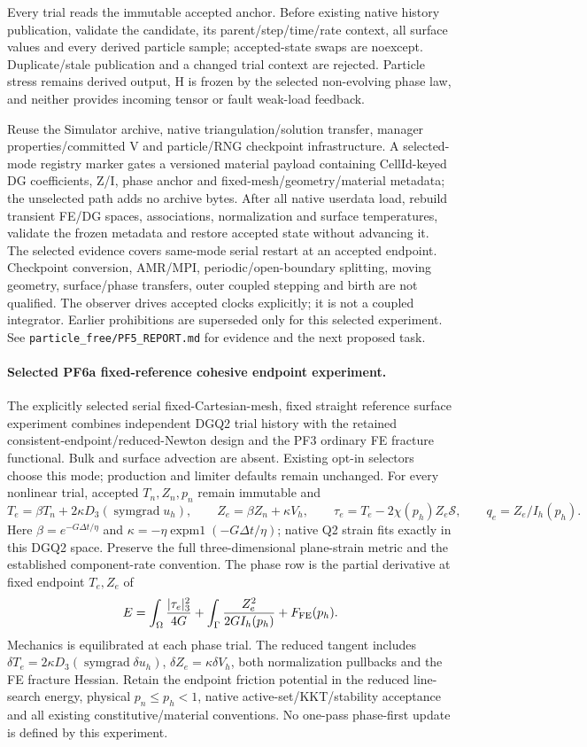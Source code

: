 \documentclass[11pt]{article}
\begin{document}
Every trial reads the immutable accepted anchor. Before existing native history
publication, validate the candidate, its parent/step/time/rate context, all
surface values and every derived particle sample; accepted-state swaps are
noexcept. Duplicate/stale publication and a changed trial context are rejected.
Particle stress remains derived output, H is frozen by the selected non-evolving
phase law, and neither provides incoming tensor or fault weak-load feedback.

Reuse the Simulator archive, native triangulation/solution transfer, manager
properties/committed V and particle/RNG checkpoint infrastructure. A selected-mode
registry marker gates a versioned material payload containing CellId-keyed DG
coefficients, Z/I, phase anchor and fixed-mesh/geometry/material metadata; the
unselected path adds no archive bytes. After all native userdata load, rebuild
transient FE/DG spaces, associations, normalization and surface temperatures,
validate the frozen metadata and restore accepted state without advancing it.
The selected evidence covers same-mode serial restart at an accepted endpoint.
Checkpoint conversion, AMR/MPI, periodic/open-boundary splitting, moving geometry,
surface/phase transfers, outer coupled stepping and birth are not qualified.
The observer drives accepted clocks explicitly; it is not a coupled integrator.
Earlier prohibitions are superseded only for this selected experiment.
See \texttt{particle\_free/PF5\_REPORT.md} for evidence and the next proposed task.

\paragraph{Selected PF6a fixed-reference cohesive endpoint experiment.}
The explicitly selected serial fixed-Cartesian-mesh, fixed straight reference
surface experiment combines independent DGQ2 trial history with the retained
consistent-endpoint/reduced-Newton design and the PF3 ordinary FE fracture
functional. Bulk and surface advection are absent. Existing opt-in selectors
choose this mode; production and limiter defaults remain unchanged.
For every nonlinear trial, accepted $T_n,Z_n,p_n$ remain immutable and
\[
 T_e=\beta T_n+2\kappa D_3(\operatorname{symgrad}u_h),\qquad
 Z_e=\beta Z_n+\kappa V_h,\qquad
 \tau_e=T_e-2\chi(p_h)Z_e\mathcal S,\qquad q_e=Z_e/I_h(p_h).
\]
Here $\beta=e^{-G\Delta t/\eta}$ and
$\kappa=-\eta\operatorname{expm1}(-G\Delta t/\eta)$; native Q2 strain fits
exactly in this DGQ2 space. Preserve the full three-dimensional plane-strain
metric and the established component-rate convention. The phase row is the
partial derivative at fixed endpoint $T_e,Z_e$ of
\[
 E=\int_\Omega\frac{|\tau_e|_3^2}{4G}
   +\int_\Gamma\frac{Z_e^2}{2G I_h(p_h)}+F_{\rm FE}(p_h).
\]
Mechanics is equilibrated at each phase trial. The reduced tangent includes
$\delta T_e=2\kappa D_3(\operatorname{symgrad}\delta u_h)$,
$\delta Z_e=\kappa\delta V_h$, both normalization pullbacks and the FE fracture
Hessian. Retain the endpoint friction potential in the reduced line-search
energy, physical $p_n\le p_h<1$, native active-set/KKT/stability acceptance and
all existing constitutive/material conventions. No one-pass phase-first update
is defined by this experiment.
\end{document}
